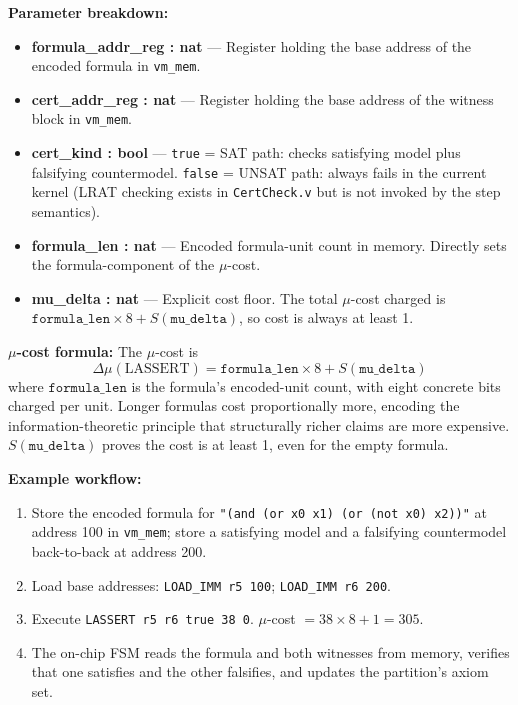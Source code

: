 \textbf{Parameter breakdown:}
\begin{itemize}
    \item \textbf{formula\_addr\_reg : nat} — Register holding the base address of the encoded formula in \texttt{vm\_mem}.
    \item \textbf{cert\_addr\_reg : nat} — Register holding the base address of the witness block in \texttt{vm\_mem}.
    \item \textbf{cert\_kind : bool} — \texttt{true} = SAT path: checks satisfying model plus falsifying countermodel. \texttt{false} = UNSAT path: always fails in the current kernel (LRAT checking exists in \texttt{CertCheck.v} but is not invoked by the step semantics).
    \item \textbf{formula\_len : nat} — Encoded formula-unit count in memory. Directly sets the formula-component of the $\mu$-cost.
    \item \textbf{mu\_delta : nat} — Explicit cost floor. The total $\mu$-cost charged is $\mathtt{formula\_len} \times 8 + S(\mathtt{mu\_delta})$, so cost is always at least 1.
\end{itemize}

\textbf{$\mu$-cost formula:} The $\mu$-cost is
\[
  \Delta\mu(\text{LASSERT}) = \mathtt{formula\_len} \times 8 + S(\mathtt{mu\_delta})
\]
where $\mathtt{formula\_len}$ is the formula's encoded-unit count, with eight concrete bits charged per unit. Longer formulas cost proportionally more, encoding the information-theoretic principle that structurally richer claims are more expensive. $S(\mathtt{mu\_delta})$ proves the cost is at least 1, even for the empty formula.

\textbf{Example workflow:}
\begin{enumerate}
    \item Store the encoded formula for \texttt{"(and (or x0 x1) (or (not x0) x2))"} at address 100 in \texttt{vm\_mem}; store a satisfying model and a falsifying countermodel back-to-back at address 200.
    \item Load base addresses: \texttt{LOAD\_IMM r5 100}; \texttt{LOAD\_IMM r6 200}.
    \item Execute \texttt{LASSERT r5 r6 true 38 0}. $\mu$-cost $= 38 \times 8 + 1 = 305$.
    \item The on-chip FSM reads the formula and both witnesses from memory, verifies that one satisfies and the other falsifies, and updates the partition's axiom set.
\end{enumerate}


